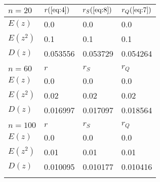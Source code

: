 \begin{tabular}{|l|l|l|l|}\hline $n=20$&$r(\ref{eq:4})$&$r_S(\ref{eq:8})$&$r_Q(\ref{eq:7})$  \\\hline$E(z)$&0.0&0.0&0.0\\\hline$E(z^2)$&0.1&0.1&0.1\\\hline$D(z)$&0.053556&0.053729&0.054264\\\hline &  &  &  \\\hline $n=60$&$r$&$r_S$&$r_Q$  \\\hline$E(z)$&0.0&0.0&0.0\\\hline$E(z^2)$&0.02&0.02&0.02\\\hline$D(z)$&0.016997&0.017097&0.018564\\\hline &  &  &  \\\hline $n=100$&$r$&$r_S$&$r_Q$  \\\hline$E(z)$&0.0&0.0&0.0\\\hline$E(z^2)$&0.01&0.01&0.01\\\hline$D(z)$&0.010095&0.010177&0.010416\\\hline &  &  &  \\\hline \end{tabular}
